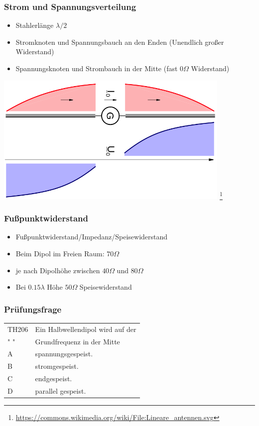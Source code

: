 \begin{frame}
    \frametitle{Strom und Spannungsverteilung}
	\begin{itemize}
		\item Stahlerlänge $\lambda / 2$
		\item Stromknoten und Spannungsbauch an den Enden (Unendlich großer Widerstand)
        \item Spannungsknoten und Strombauch in der Mitte (fast $0 \Omega$ Widerstand)
    \end{itemize}
    \begin{center}
        \includegraphics[width=0.85\textwidth]{e11/DipolUI.png}
        \footnote{\tiny \url{https://commons.wikimedia.org/wiki/File:Lineare_antennen.svg}}
	\end{center}
\end{frame}

\begin{frame}
    \frametitle{Fußpunktwiderstand}
    \begin{center}
	\begin{itemize}
		\item Fußpunktwiderstand/Impedanz/Speisewiderstand
		\item Beim Dipol im Freien Raum: $70 \Omega$
		\item je nach Dipolhöhe zwischen $40  \Omega$ und $80  \Omega$
		\item  Bei $0.15 \lambda$ Höhe $50  \Omega$ Speisewiderstand 
    \end{itemize}
 	\end{center}
\end{frame}

\begin{frame}
    \frametitle{Prüfungsfrage}

    \begin{center}
    \begin{tabular}{l||l}\hline
        TH206 & Ein Halbwellendipol wird auf der  \\
         " "  & Grundfrequenz in der Mitte \\ \hline\hline
         A & spannungsgespeist.\\\hline
         B & stromgespeist. \\\hline
         C & endgespeist. \\ \hline
         D & parallel gespeist.\\\hline
    \end{tabular}
 	\end{center}
\end{frame}


